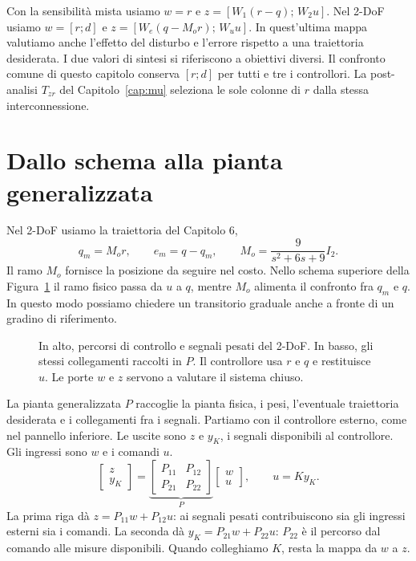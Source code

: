 Con la sensibilità mista usiamo $w=r$ e
$z=[W_1(r-q);\,W_2u]$. Nel 2-DoF usiamo $w=[r;d]$ e
$z=[W_e(q-M_or);\,W_uu]$. In quest'ultima mappa valutiamo
anche l'effetto del disturbo e l'errore rispetto a una traiettoria
desiderata. I due valori di sintesi si riferiscono a obiettivi diversi.
Il confronto comune di questo capitolo conserva $[r;d]$ per tutti
e tre i controllori. La post-analisi $T_{zr}$ del Capitolo~\ref{cap:mu}
seleziona le sole colonne di $r$ dalla stessa interconnessione.

\section{Dallo schema alla pianta generalizzata}
\label{sec:generalizedplant}

Nel 2-DoF usiamo la traiettoria del Capitolo 6,
\[
 q_m=M_or,\qquad e_m=q-q_m,\qquad
 M_o=\frac{9}{s^2+6s+9}I_2.
\]
Il ramo $M_o$ fornisce la posizione da seguire nel costo.
Nello schema superiore della Figura~\ref{fig:generalizedplant} il ramo
fisico passa da $u$ a $q$, mentre $M_o$ alimenta il confronto fra
$q_m$ e $q$. In questo modo possiamo chiedere un transitorio graduale
anche a fronte di un gradino di riferimento.

\begin{figure}[!htb]\centering
\resizebox{.92\textwidth}{!}{}
\caption{In alto, percorsi di controllo e segnali pesati del 2-DoF.
In basso, gli stessi collegamenti raccolti in $P$. Il controllore
usa $r$ e $q$ e restituisce $u$. Le porte $w$ e $z$ servono a
valutare il sistema chiuso.}
\label{fig:generalizedplant}
\end{figure}

La pianta generalizzata $P$ raccoglie la pianta fisica, i pesi,
l'eventuale traiettoria desiderata e i collegamenti fra i segnali.
Partiamo con il controllore esterno, come nel pannello inferiore.
Le uscite sono $z$ e $y_K$, i segnali disponibili al controllore.
Gli ingressi sono $w$ e i comandi $u$.
\[
 \begin{bmatrix}z\\y_K\end{bmatrix}
 =\underbrace{\begin{bmatrix}P_{11}&P_{12}\\P_{21}&P_{22}\end{bmatrix}}_{P}
  \begin{bmatrix}w\\u\end{bmatrix},\qquad u=Ky_K.
\]
La prima riga dà $z=P_{11}w+P_{12}u$: ai segnali pesati
contribuiscono sia gli ingressi esterni sia i comandi. La seconda
dà $y_K=P_{21}w+P_{22}u$: $P_{22}$ è il percorso dal comando alle
misure disponibili. Quando colleghiamo $K$, resta la mappa da $w$ a $z$.

